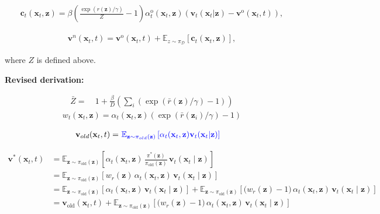 \documentclass{article} %
\begin{document}
\begin{align}
\boxed{
\mathbf{c}_t(\mathbf{x}_t,\mathbf{z})
=
\beta
\left(
\frac{\exp\!\left(r(\mathbf{z})/\gamma\right)}{Z}
-
1
\right)
\alpha_t^{\mathrm{o}}(\mathbf{x}_t,\mathbf{z})
\left(
\mathbf{v}_t(\mathbf{x}_t|\mathbf{z})
-
\mathbf{v}^{\mathrm{o}}(\mathbf{x}_t,t)
\right)
},
\end{align}


\begin{align}
\mathbf v^n(\mathbf x_t,t)
=
\mathbf v^{\mathrm{o}}(\mathbf x_t,t)
+ 
\mathbb{E}_{z\sim\pi_{\mathcal{D}}} [\mathbf c_t(\mathbf x_t,\mathbf z)],
\end{align}


where $Z$ is defined above.

\noindent\textbf{Revised derivation:}

\begin{align}
    \bar{Z}=~&
    1 + \frac{\beta}{D}(\sum_i(\exp(\bar{r}(\mathbf{z})/\gamma)-1))
\end{align}
\begin{align}
w_t(\mathbf{x}_t,\mathbf{z}) = \alpha_t(\mathbf{x}_t, \mathbf{z})(\exp(\bar{r}(\mathbf{z}_i)/\gamma) -1 )
\end{align}

\begin{align}
\mathbf{v}_{old}(\mathbf{x}_t, t) 
=~&{\color{blue}\mathbb{E}_{\mathbf{z} \sim \pi_{old}(\mathbf{z})}
    \left[\alpha_t(\mathbf{x}_t, \mathbf{z})\mathbf{v}_t(\mathbf{x}_t | \mathbf{z})\right]} 
\end{align}    


\begin{align}
    \mathbf{v}^*(\mathbf{x}_t, t)
    &=
    \mathbb{E}_{\mathbf{z} \sim \pi_{\mathrm{old}}(\mathbf{z})}
    \left[
        \alpha_t(\mathbf{x}_t, \mathbf{z})\,
        \frac{\pi^*(\mathbf{z})}{\pi_{\mathrm{old}}(\mathbf{z})}\,
        \mathbf{v}_t(\mathbf{x}_t \mid \mathbf{z})
    \right]
    \\
    &=
    \mathbb{E}_{\mathbf{z} \sim \pi_{\mathrm{old}}(\mathbf{z})}
    \left[
        w_r(\mathbf{z})\,
        \alpha_t(\mathbf{x}_t, \mathbf{z})\,
        \mathbf{v}_t(\mathbf{x}_t \mid \mathbf{z})
    \right]
    \\
    &=
    \mathbb{E}_{\mathbf{z} \sim \pi_{\mathrm{old}}(\mathbf{z})}
    \left[
        \alpha_t(\mathbf{x}_t, \mathbf{z})\,
        \mathbf{v}_t(\mathbf{x}_t \mid \mathbf{z})
    \right]
    +
    \mathbb{E}_{\mathbf{z} \sim \pi_{\mathrm{old}}(\mathbf{z})}
    \left[
        \bigl( w_r(\mathbf{z}) - 1 \bigr)\,
        \alpha_t(\mathbf{x}_t, \mathbf{z})\,
        \mathbf{v}_t(\mathbf{x}_t \mid \mathbf{z})
    \right]
    \\
    &=
    \mathbf{v}_{\mathrm{old}}(\mathbf{x}_t, t)
    +
    \mathbb{E}_{\mathbf{z} \sim \pi_{\mathrm{old}}(\mathbf{z})}
    \left[
        \bigl( w_r(\mathbf{z}) - 1 \bigr)\,
        \alpha_t(\mathbf{x}_t, \mathbf{z})\,
        \mathbf{v}_t(\mathbf{x}_t \mid \mathbf{z})
    \right]
\end{align}
\end{document}
